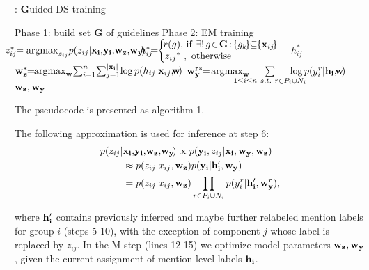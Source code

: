 \documentclass[11pt]{article}
\begin{document}
\begin{algorithm}[h!]
  \caption{:     {\bf G}uided DS training}\label{alg}
  \begin{algorithmic}[1]
    \State Phase 1: build set {\bf G} of guidelines
    \State Phase 2: EM training
		 \State  $\!\!\!\!\!\!z_{ij}^* \!\!= {\rm argmax}_{z_{ij}} p(z_{ij} |{\bf x_i,\! y_i,\!w_z,\!w_y}\!)$
		 \State $\!\!\!\!\!\!h_{ij}^*\!\!\!=\!\!
		 \left\{ \begin{array}{l}
			\!\!\!\!r(g),\!\ {\rm if\ } \exists!\ \! g\!\in\!{\bf G}\!:\! \{g_k\!\}\!\!\subseteq\!\!  \{{\bf x}_{ij}\!\} \   \\ 
			\!\!\!{z_{ij}}^*\ , {\rm\ otherwise}
		\end{array}\right.$
		 \State \!\!\!\!\! $h_{ij}^*$
	 	\EndFor 		
    	\EndFor 
	\State \!${\bf w}_{\bf z}^*\!\! 
			=\!\!{\rm argmax}_{\bf w}\!\sum_{i=1}^n\!\sum_{j=1}^{|{\bf x_i}|}\! \log p(h_{ij} | {\bf x}_{ij}, \!\!{\bf w}\!)$
	 \State \!\!\!\!${\bf w_y^{r*}}\!\! =\!{\rm argmax}_{\bf w}\!\!\!\!\!\!\!\!\!\!\!\sum\limits_{1\le i\le n\ s.t.\ r\in P_i\cup N_i}
		                                                                                     \!\!\!\!\!\!\!\!\!\!\!   \log p(y_i^r | {\bf h_i}, \!\!{\bf w}\!)$
	\EndFor
    \EndFor 
     $\bf w_z, w_y$
  \end{algorithmic}
  \label{algDS}
\end{algorithm}

The pseudocode is presented as algorithm 1.

The following approximation is used for inference at step 6:
\begin{align*}p(z_{ij} | &{\bf x_i,\! y_i,\!w_z,\!w_y}\!) \propto p({\bf y_i}, z_{ij} |{\bf x_i, w_y, w_z})\\
			     &\approx p(z_{ij} |x_{ij}, {\bf w_z}) p({\bf y_i | h_i', w_y})\\
			     & = p(z_{ij} | x_{ij}, {\bf w_z}) \prod_{r\in P_i\cup N_i} p(y_i^r | {\bf h_i', w_y^r}),
\end{align*}


where ${\bf h_i'}$ contains previously inferred and maybe further relabeled mention labels for group $i$ (steps 5-10), with the exception of component $j$ whose label is replaced by $z_{ij}$. 
In the M-step (lines 12-15) we optimize model parameters $\bf w_z, w_y$, given the current assignment 
of mention-level labels $\bf h_i$.
\end{document}
